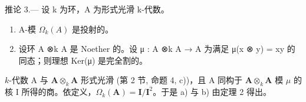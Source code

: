 推论 3.--- 设 k 为环，A 为形式光滑 k-代数。

\begin{enumerate}
\def\labelenumi{\alph{enumi})}
\item
  A-模 \(\Omega_k(A)\) 是投射的。
\item
  设环 A ⊗k A 是 Noether 的。设 μ : A ⊗k A → A 为满足 μ(x ⊗ y) = xy 的同态；则理想 Ker(μ) 是完全割的。
\end{enumerate}

\(k\)-代数 A 与 \(\mathbf{A} \otimes_{k} \mathbf{A}\) 形式光滑 (第 2 节, 命题 4, c))，且 A 同构于 \(\mathbf{A} \otimes_{k} \mathbf{A}\) 模 \(\mu\) 的核 I 所得的商。依定义，\(\Omega_{k}(\mathbf{A}) = \mathbf{I}/\mathbf{I}^{2}\)。于是 a) 与 b) 由定理 2 得出。

